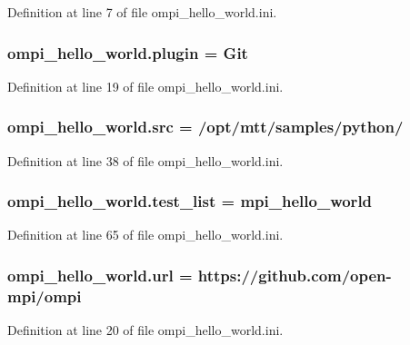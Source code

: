 Definition at line 7 of file ompi\-\_\-hello\-\_\-world.\-ini.

\hypertarget{namespaceompi__hello__world_a687eab84563b30840a200bfaf5407f51}{
\subsubsection[{plugin}]{\setlength{\rightskip}{0pt plus 5cm}ompi\-\_\-hello\-\_\-world.\-plugin = Git}}\label{namespaceompi__hello__world_a687eab84563b30840a200bfaf5407f51}


Definition at line 19 of file ompi\-\_\-hello\-\_\-world.\-ini.

\hypertarget{namespaceompi__hello__world_a89cf2df98bd1f53501da343b4a25846c}{
\subsubsection[{src}]{\setlength{\rightskip}{0pt plus 5cm}ompi\-\_\-hello\-\_\-world.\-src = /opt/mtt/samples/python/}}\label{namespaceompi__hello__world_a89cf2df98bd1f53501da343b4a25846c}


Definition at line 38 of file ompi\-\_\-hello\-\_\-world.\-ini.

\hypertarget{namespaceompi__hello__world_a7df798e8beb69ae3bf2537c25e7b7370}{
\subsubsection[{test\-\_\-list}]{\setlength{\rightskip}{0pt plus 5cm}ompi\-\_\-hello\-\_\-world.\-test\-\_\-list = mpi\-\_\-hello\-\_\-world}}\label{namespaceompi__hello__world_a7df798e8beb69ae3bf2537c25e7b7370}


Definition at line 65 of file ompi\-\_\-hello\-\_\-world.\-ini.

\hypertarget{namespaceompi__hello__world_ae0dcf6cc43abc8d11428686639a5059a}{
\subsubsection[{url}]{\setlength{\rightskip}{0pt plus 5cm}ompi\-\_\-hello\-\_\-world.\-url = https\-://github.\-com/open-\/mpi/ompi}}\label{namespaceompi__hello__world_ae0dcf6cc43abc8d11428686639a5059a}


Definition at line 20 of file ompi\-\_\-hello\-\_\-world.\-ini.

